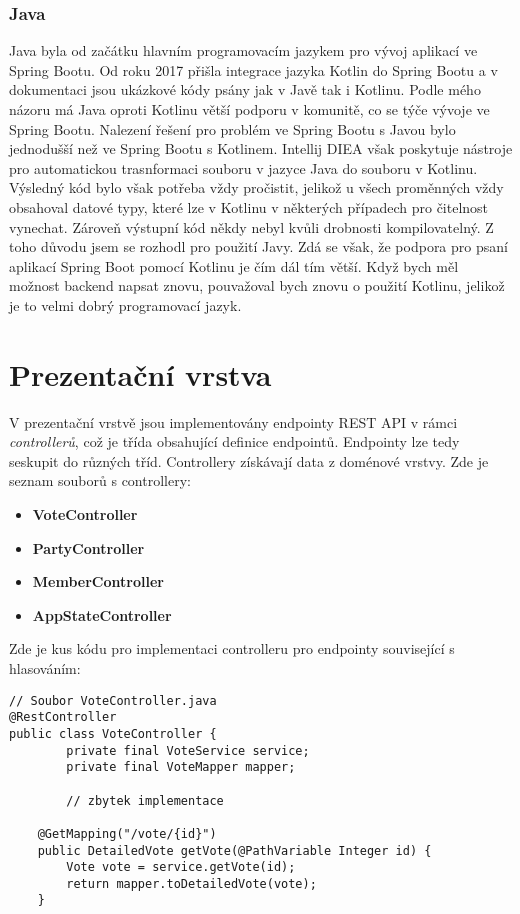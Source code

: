 \subsubsection*{Java}
Java byla od začátku hlavním programovacím jazykem pro vývoj aplikací ve Spring Bootu. Od roku 2017 přišla integrace jazyka Kotlin do Spring Bootu \cite{kotlin-support} a v dokumentaci jsou ukázkové kódy psány jak v Javě tak i Kotlinu. Podle mého názoru má Java oproti Kotlinu větší podporu v komunitě, co se týče vývoje ve Spring Bootu. Nalezení řešení pro problém ve Spring Bootu \linebreak s Javou bylo jednodušší než ve Spring Bootu s Kotlinem. Intellij DIEA však poskytuje nástroje pro automatickou trasnformaci souboru v jazyce Java do souboru v Kotlinu. Výsledný kód bylo však potřeba vždy pročistit, jelikož u všech proměnných vždy obsahoval datové typy, které lze \linebreak v Kotlinu v některých případech pro čitelnost vynechat. Zároveň výstupní kód někdy nebyl kvůli drobnosti kompilovatelný. Z toho důvodu jsem se rozhodl pro použití Javy. Zdá se však, že podpora pro psaní aplikací Spring Boot pomocí Kotlinu je čím dál tím větší. Když bych měl možnost backend napsat znovu, pouvažoval bych znovu o použití Kotlinu, jelikož je to velmi dobrý programovací jazyk.

\section {Prezentační vrstva}
V prezentační vrstvě jsou implementovány endpointy REST API v rámci \textit{controllerů}, což je třída obsahující definice endpointů. Endpointy lze tedy seskupit do různých tříd. Controllery získávají data z doménové vrstvy. Zde je seznam souborů s controllery:

\begin{itemize}
	\item \textbf{VoteController}
	\item \textbf{PartyController}
	\item \textbf{MemberController}
	\item \textbf{AppStateController}
\end{itemize}

\noindent Zde je kus kódu pro implementaci controlleru pro endpointy související s hlasováním:

\newpage

\begin{lstlisting}[caption={Ukázka kódu pro vytvoření endpointu}, label={lst:controller-votes}, tabsize=2]
// Soubor VoteController.java
@RestController
public class VoteController {
		private final VoteService service;
		private final VoteMapper mapper;
		
		// zbytek implementace
		
	@GetMapping("/vote/{id}")
	public DetailedVote getVote(@PathVariable Integer id) {
		Vote vote = service.getVote(id);
		return mapper.toDetailedVote(vote);
	}
\end{lstlisting}

